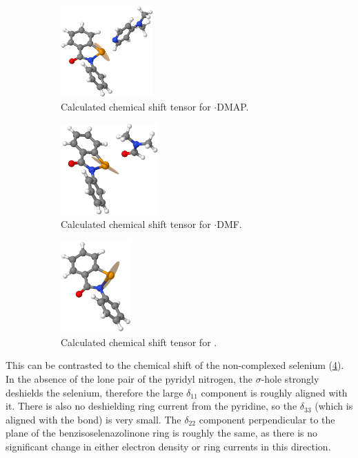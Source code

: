 \begin{refsection}
\begin{figure}
  \centering
  \begin{subfigure}{0.3\linewidth}
    \centering
    \includegraphics[height=3.5cm]{Figures/77se-tensor-ebs-dmap.png}
    \caption{Calculated chemical shift tensor for $\cdot$DMAP.}
    \label{fig:77se-tensor-ebs-dmap}
  \end{subfigure}
  \begin{subfigure}{0.3\linewidth}
    \centering
    \includegraphics[height=3.5cm]{Figures/77se-tensor-ebs-dmf.png}
    \caption{Calculated chemical shift tensor for $\cdot$DMF.}
    \label{fig:77se-tensor-ebs-dmf}
  \end{subfigure}
  \begin{subfigure}{0.3\linewidth}
    \centering
    \includegraphics[height=3.5cm]{Figures/77se-tensor-ebs.png}
    \caption{Calculated chemical shift tensor for .}
    \label{fig:77se-tensor-ebs}
  \end{subfigure}
  \caption{}
\end{figure}

This can be contrasted to the chemical shift of the non-complexed selenium (\cref{fig:77se-tensor-ebs}).
In the absence of the lone pair of the pyridyl nitrogen, the $\sigma$-hole strongly deshields the selenium, therefore the large $\delta_{11}$ component is roughly aligned with it.
There is also no deshielding ring current from the pyridine, so the $\delta_{33}$ (which is aligned with the  bond) is very small.
The $\delta_{22}$ component perpendicular to the plane of the benzisoselenazolinone ring is roughly the same, as there is no significant change in either electron density or ring currents in this direction.


\end{refsection}
